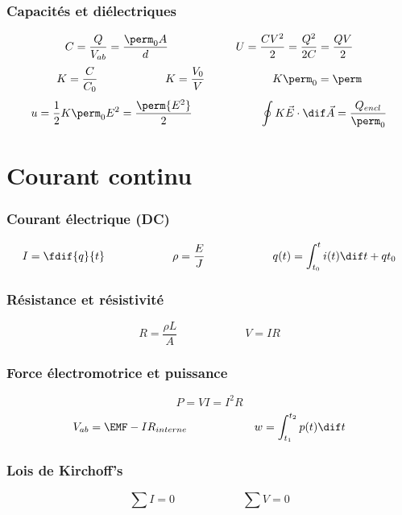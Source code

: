 \section{Capacités et diélectriques}
\[ C = \frac{Q}{V_{ab}} = \frac{\perm_0A}{d}\qquad{\qquad{\qquad}} U
= \frac{CV^2}{2} = \frac{Q^2}{2C} = \frac{QV}{2} \]
\[ K = \frac{C}{C_0}  \qquad{\qquad{\qquad}}   K = \frac{V_0}{V}
\qquad{\qquad{\qquad}}    K\perm_0 = \perm \]
\[ u = \frac{1}{2}K\perm_0E^2 = \frac{\perm{E^2}}{2}
\qquad{\qquad{\qquad}} \oint{K}\vec{E}\cdot\dif\vec{A}
= \frac{Q_{encl}}{\perm_0} \]

\part{Courant continu}
\section{Courant électrique (DC)}
\[ I = \fdif{q}{t}\qquad{\qquad{\qquad}}\rho =
\frac{E}{J}\qquad{\qquad{\qquad}}q(t) = \int_{t_0}^{t}i(t) \dif t + q{t_0} \]

\section{Résistance et résistivité}
\[ R = \frac{\rho{L}}{A} \qquad{\qquad{\qquad}}V = IR \]

\section{Force électromotrice et puissance}
\[ P = VI = I^2R \] 
\[ V_{ab} = \EMF - IR_{interne}\qquad{\qquad{\qquad}}w
= \int_{t_1}^{t_2}p(t) \dif t \]

\section{Lois de Kirchoff's}
\[ \sum{I} = 0  \qquad{\qquad{\qquad}}\sum{V} = 0 \]

